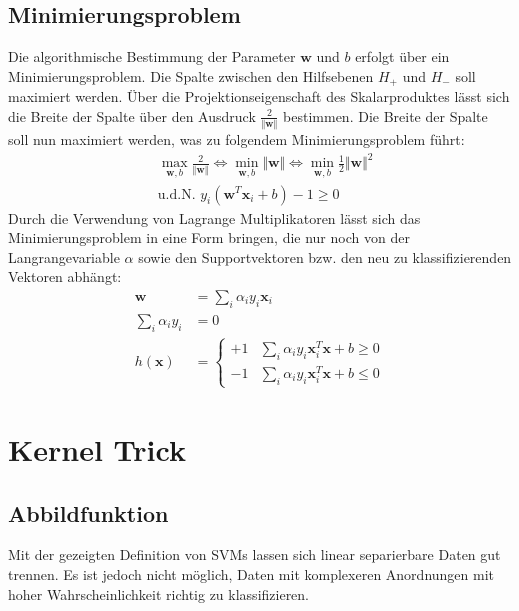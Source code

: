 \documentclass[10pt,a4paper]{scrartcl}
\begin{document}
            \subsection{Minimierungsproblem}
                Die algorithmische Bestimmung der Parameter $\boldsymbol{w}$ und $b$ erfolgt über ein Minimierungsproblem. Die Spalte zwischen den Hilfsebenen $H_+$ und $H_-$ soll maximiert werden. Über die Projektionseigenschaft des Skalarproduktes lässt sich die Breite der Spalte über den Ausdruck $\frac{2}{\Vert \boldsymbol{w} \Vert}$ bestimmen. Die Breite der Spalte soll nun maximiert werden, was zu folgendem Minimierungsproblem führt:
                \begin{align*}
                    & \max_{\boldsymbol{w}, b} \frac{2}{\Vert \boldsymbol{w} \Vert} \Leftrightarrow \min_{\boldsymbol{w}, b} \Vert \boldsymbol{w} \Vert \Leftrightarrow \min_{\boldsymbol{w}, b} \frac{1}{2} \Vert \boldsymbol{w} \Vert^2 \\
                    & \text{u.d.N. } y_i ( \boldsymbol{w}^T \boldsymbol{x}_i + b ) - 1 \geq 0
                \end{align*}
                Durch die Verwendung von Lagrange Multiplikatoren lässt sich das Minimierungsproblem in eine Form bringen, die nur noch von der Langrangevariable $\alpha$ sowie den Supportvektoren bzw. den neu zu klassifizierenden Vektoren abhängt:
                \begin{align*}
                    \boldsymbol{w} &= \sum_i \alpha_i y_i \boldsymbol{x}_i \\
                    \sum_i \alpha_i y_i &= 0 \\
                    h(\boldsymbol{x}) &= \begin{cases}
                        +1 & \sum_i \alpha_i y_i \boldsymbol{x}_i^T \boldsymbol{x} + b \geq 0 \\
                        -1 & \sum_i \alpha_i y_i \boldsymbol{x}_i^T \boldsymbol{x} + b \leq 0
                    \end{cases}
                \end{align*}

        \section{Kernel Trick}
            \subsection{Abbildfunktion}
                Mit der gezeigten Definition von SVMs lassen sich linear separierbare Daten gut trennen.
                Es ist jedoch nicht möglich, Daten mit komplexeren Anordnungen mit hoher Wahrscheinlichkeit richtig zu klassifizieren. \\
                
\end{document}
